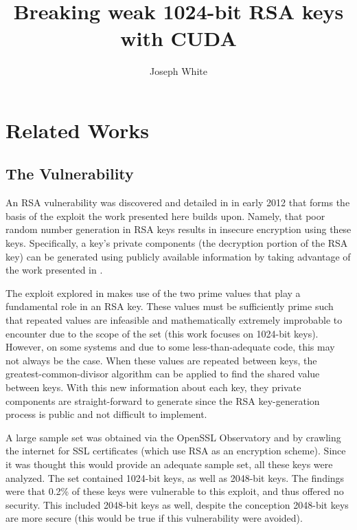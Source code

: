 \documentclass[12pt]{ucthesis}
\begin{document}
\pagestyle{plain}

\renewcommand{\baselinestretch}{1.66}

\title{Breaking weak 1024-bit RSA keys with CUDA}
\author{Joseph White}
  
 
 
 
\maketitle


\chapter{Related Works}
\label{related}

\section{The Vulnerability}
An RSA vulnerability was discovered and detailed in \cite{lenstra2012ron} in
early 2012 that forms the basis of the exploit the work presented here builds
upon. Namely, that poor random number generation in RSA keys results in
insecure encryption using these keys. Specifically, a key's private components
(the decryption portion of the RSA key) can be generated using publicly
available information by taking advantage of the work presented in
\cite{lenstra2012ron}.

The exploit explored in \cite{lenstra2012ron} makes use of the two prime
values that play a fundamental role in an RSA key. These values must be
sufficiently prime such that repeated values are infeasible and mathematically
extremely improbable to encounter due to the scope of the set (this work
focuses on 1024-bit keys). However, on some systems and due to some
less-than-adequate code, this may not always be the case. When these values are
repeated between keys, the greatest-common-divisor algorithm can be applied to
find the shared value between keys. With this new information about each key,
they private components are straight-forward to generate since the RSA
key-generation process is public and not difficult to implement.

A large sample set was obtained via the OpenSSL Observatory and by crawling the
internet for SSL certificates (which use RSA as an encryption scheme). Since it
was thought this would provide an adequate sample set, all these keys were
analyzed. The set contained 1024-bit keys, as well as 2048-bit keys. The
findings were that 0.2\% of these keys were vulnerable to this exploit, and
thus offered no security. This included 2048-bit keys as well, despite the
conception 2048-bit keys are more secure (this would be true if this
vulnerability were avoided).
\end{document}
